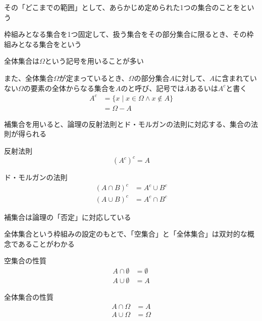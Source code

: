 \documentclass[b5paper,12pt]{jsarticle}
\begin{document}
その「どこまでの範囲」として、あらかじめ定められた1つの集合のことをという

\sectionline

枠組みとなる集合を1つ固定して、扱う集合をその部分集合に限るとき、その枠組みとなる集合をという

全体集合は$\Omega $という記号を用いることが多い

\br

また、全体集合$\Omega $が定まっているとき、$\Omega$の部分集合$A$に対して、$A$に含まれていない$\Omega$の要素の全体からなる集合を$A$のと呼び、記号では$\overline{A}$あるいは$A^c$と書く
\begin{align*}
  A^c & = \{x \mid x \in \Omega \land x \notin A\} \\
      & = \Omega - A
\end{align*}

\sectionline

補集合を用いると、論理の反射法則とド・モルガンの法則に対応する、集合の法則が得られる

\begin{theorem}{反射法則}
  \begin{equation*}
    (A^c)^c = A
  \end{equation*}
\end{theorem}

\begin{theorem}{ド・モルガンの法則}
  \begin{align*}
    (A \cap B)^c & = A^c \cup B^c \\
    (A \cup B)^c & = A^c \cap B^c
  \end{align*}
\end{theorem}

補集合は論理の「否定」に対応している

\sectionline

全体集合という枠組みの設定のもとで、「空集合」と「全体集合」は双対的な概念であることがわかる

\begin{theorem}{空集合の性質}
  \begin{align*}
    A \cap \emptyset & = \emptyset \\
    A \cup \emptyset & = A
  \end{align*}
\end{theorem}

\begin{theorem}{全体集合の性質}
  \begin{align*}
    A \cap \Omega & = A      \\
    A \cup \Omega & = \Omega
  \end{align*}
\end{theorem}
\end{document}
